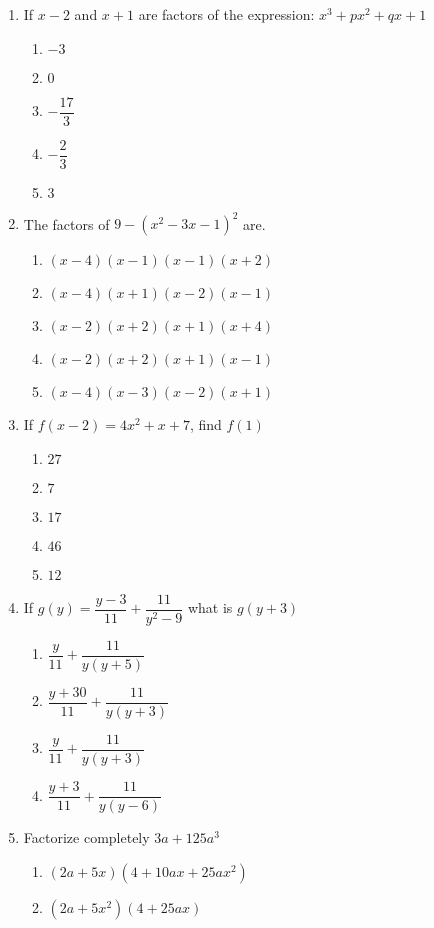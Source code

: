 \begin{multicols}{2}
\begin{enumerate}[label={\arabic*.}]
\begin{enumerate}[label={\Alph*.}]
	\end{enumerate}
\item If \(x-2\) and \(x+1\) are factors of the expression: \({x}^{3}+p{x}^{2}+qx+1\)
	\begin{enumerate}[label={\Alph*.}]
	\item \(-3\)
	\item \(0\)
	\item \(-\dfrac{17}{3}\)
	\item \(-\dfrac{2}{3}\)
	\item \(3\)
	\end{enumerate}
\item The factors of \(9-\left({x}^{2}-3x-1\right)^2\) are. 
	\begin{enumerate}[label={\Alph*.}]
	\item \((x-4)(x-1)(x-1)(x+2)\)
	\item \((x-4)(x+1)(x-2)(x-1)\)
	\item \((x-2)(x+2)(x+1)(x+4)\)
	\item \((x-2)(x+2)(x+1)(x-1)\)
	\item \((x-4)(x-3)(x-2)(x+1)\)
	\end{enumerate}
\item If \(f(x-2) = 4{x}^{2} + x + 7 \), find \(f(1)\)
	\begin{enumerate}[label={\Alph*.}]
	\item \(27\)
	\item \(7\)
	\item \(17\)
	\item \(46\)
	\item \(12\)
	\end{enumerate}
\item If \(g(y) = \dfrac{y - 3}{11} + \dfrac{11}{y^2-9}\) what is \(g(y+3)\)
	\begin{enumerate}[label={\Alph*.}]
	\item \(\dfrac{y}{11} + \dfrac{11}{y(y+5)}\)
	\item \(\dfrac{y+30}{11} + \dfrac{11}{y(y+3)}\)
	\item \(\dfrac{y}{11} + \dfrac{11}{y(y+3)}\)
	\item \(\dfrac{y+3}{11}+\dfrac{11}{y(y-6)}\)
	\end{enumerate}
\item Factorize completely \(3a+125a^3\)
	\begin{enumerate}[label={\Alph*.}]
	\item \((2a+5x)(4+10ax + 25a{x}^{2})\)
	\item \((2a+5{x}^{2})(4+25ax)\)

\end{enumerate}
\end{enumerate}
\end{multicols}
